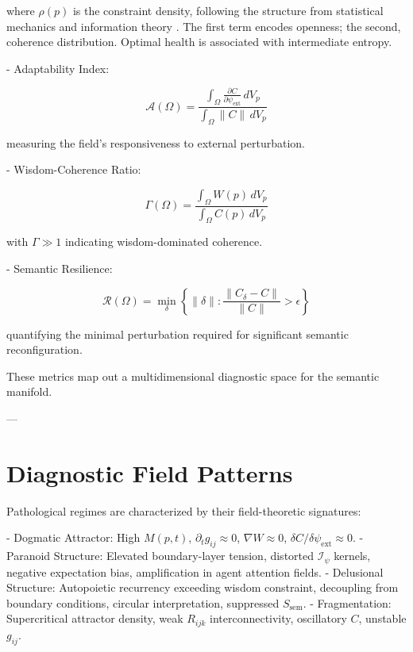 where $\rho(p)$ is the constraint density, following the structure from statistical mechanics and information theory \autocite{Reif1965, PathriaBeale2011, Shannon1948}. The first term encodes openness; the second, coherence distribution. Optimal health is associated with intermediate entropy.

- Adaptability Index:

\begin{equation}
\mathcal{A}(\Omega) = \frac{\int_{\Omega} \frac{\partial C}{\partial \psi_{\text{ext}}} \, dV_p}{\int_{\Omega} \|C\| \, dV_p}
\end{equation}

measuring the field's responsiveness to external perturbation.

- Wisdom-Coherence Ratio:

\begin{equation}
\Gamma(\Omega) = \frac{\int_{\Omega} W(p) \, dV_p}{\int_{\Omega} C(p) \, dV_p}
\end{equation}

with $\Gamma \gg 1$ indicating wisdom-dominated coherence.

- Semantic Resilience:

\begin{equation}
\mathcal{R}(\Omega) = \min_{\delta} \left\{\|\delta\| : \frac{\|C_{\delta} - C\|}{\|C\|} > \epsilon\right\}
\end{equation}

quantifying the minimal perturbation required for significant semantic reconfiguration.

These metrics map out a multidimensional diagnostic space for the semantic manifold.

---

\section{Diagnostic Field Patterns}

Pathological regimes are characterized by their field-theoretic signatures:

- Dogmatic Attractor: High $M(p,t)$, $\partial_t g_{ij} \approx 0$, $\nabla W \approx 0$, $\delta C / \delta \psi_{\text{ext}} \approx 0$.
- Paranoid Structure: Elevated boundary-layer tension, distorted $\mathcal{I}_{\psi}$ kernels, negative expectation bias, amplification in agent attention fields.
- Delusional Structure: Autopoietic recurrency exceeding wisdom constraint, decoupling from boundary conditions, circular interpretation, suppressed $S_{\text{sem}}$.
- Fragmentation: Supercritical attractor density, weak $R_{ijk}$ interconnectivity, oscillatory $C$, unstable $g_{ij}$.

